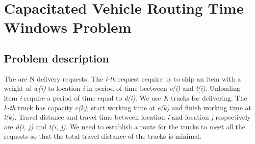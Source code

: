 \section{Capacitated Vehicle Routing Time Windows Problem}

\subsection{Problem description}
The are N delivery requests. The \emph{i-th} request require us to ship an item with a weight of \emph{w(i)} to location \emph{i} in period of time beetween \emph{e(i)} and \emph{l(i)}. Unloading item \emph{i} require a period of time equal to \emph{d(i)}. We use \emph{K} trucks for delivering. The \emph{k-th} truck has capacity \emph{c(k)}, start working time at \emph{e(k)} and finish working time at \emph{l(k)}. Travel distance and travel time between location \emph{i} and location \emph{j} respectively are \emph{d(i, j)} and \emph{t(i, j)}. We need to establish a route for the trucks to meet all the requests so that the total travel distance of the trucks is minimal.

